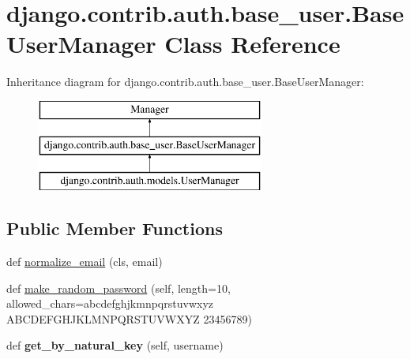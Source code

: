\hypertarget{classdjango_1_1contrib_1_1auth_1_1base__user_1_1_base_user_manager}{}\section{django.\+contrib.\+auth.\+base\+\_\+user.\+Base\+User\+Manager Class Reference}
\label{classdjango_1_1contrib_1_1auth_1_1base__user_1_1_base_user_manager}
Inheritance diagram for django.\+contrib.\+auth.\+base\+\_\+user.\+Base\+User\+Manager\+:\begin{figure}[H]
\begin{center}
\leavevmode
\includegraphics[height=3.000000cm]{classdjango_1_1contrib_1_1auth_1_1base__user_1_1_base_user_manager}
\end{center}
\end{figure}
\subsection*{Public Member Functions}
\begin{DoxyCompactItemize}
\item 
def \mbox{\hyperlink{classdjango_1_1contrib_1_1auth_1_1base__user_1_1_base_user_manager_a079e4b86ddee69481ebbd805c0a4f2aa}{normalize\+\_\+email}} (cls, email)
\item 
def \mbox{\hyperlink{classdjango_1_1contrib_1_1auth_1_1base__user_1_1_base_user_manager_afc9a6db1973fae4566941386188c02a0}{make\+\_\+random\+\_\+password}} (self, length=10, allowed\+\_\+chars=\textquotesingle{}abcdefghjkmnpqrstuvwxyz\textquotesingle{} \textquotesingle{}A\+B\+C\+D\+E\+F\+G\+H\+J\+K\+L\+M\+N\+P\+Q\+R\+S\+T\+U\+V\+W\+X\+YZ\textquotesingle{} \textquotesingle{}23456789\textquotesingle{})
\item 
\mbox{\label{classdjango_1_1contrib_1_1auth_1_1base__user_1_1_base_user_manager_aacab57a037e2f3493bae953c77096c15}} 
def {\bfseries get\+\_\+by\+\_\+natural\+\_\+key} (self, username)
\end{DoxyCompactItemize}


